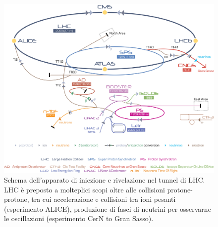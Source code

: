 \begin{figure}[!htb]
  \centering
    \includegraphics[width=.75\textwidth]{figures/Cern-Accelerator-Complex.jpg}
  \caption{Schema dell'apparato di iniezione e rivelazione nel tunnel di LHC. LHC \`e preposto a molteplici scopi oltre alle collisioni protone-protone, tra cui accelerazione e collisioni tra ioni pesanti (esperimento ALICE), produzione di fasci di neutrini per osservarne le oscillazioni (esperimento CerN to Gran Sasso).}
  \label{fig:LHC_accelerator_complex}
\end{figure}

